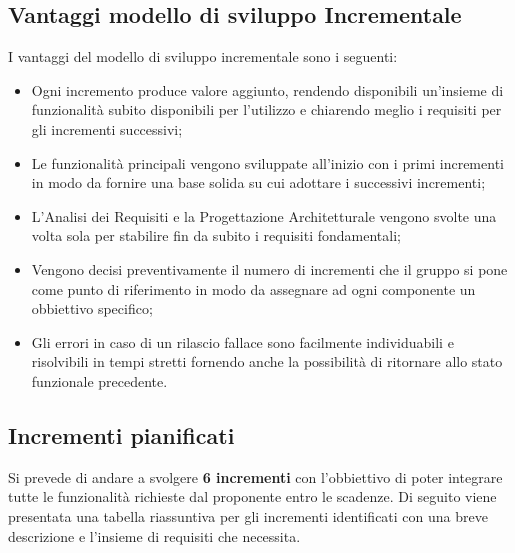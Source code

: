 \subsection{Vantaggi modello di sviluppo Incrementale}
	I vantaggi del modello di sviluppo incrementale sono i seguenti:
	\begin{itemize}
		\item Ogni incremento produce valore aggiunto, rendendo disponibili un'insieme di funzionalità subito disponibili per l'utilizzo e chiarendo meglio i requisiti per gli incrementi successivi;
		\item Le funzionalità principali vengono sviluppate all'inizio con i primi incrementi in modo da fornire una base solida su cui adottare i successivi incrementi;
		\item L'Analisi dei Requisiti e la Progettazione Architetturale vengono svolte una volta sola per stabilire fin da subito i requisiti fondamentali;
		\item Vengono decisi preventivamente il numero di incrementi che il gruppo si pone come punto di riferimento in modo da assegnare ad ogni componente un obbiettivo specifico;
		\item Gli errori in caso di un rilascio fallace sono facilmente individuabili e risolvibili in tempi stretti fornendo anche la possibilità di ritornare allo stato funzionale precedente.
	\end{itemize}

\subsection{Incrementi pianificati}

Si prevede di andare a svolgere \textbf{6 incrementi} con l'obbiettivo di poter integrare tutte le funzionalità richieste dal proponente entro le scadenze. Di seguito viene presentata una tabella riassuntiva per gli incrementi identificati con una breve descrizione e l'insieme di requisiti che necessita.

